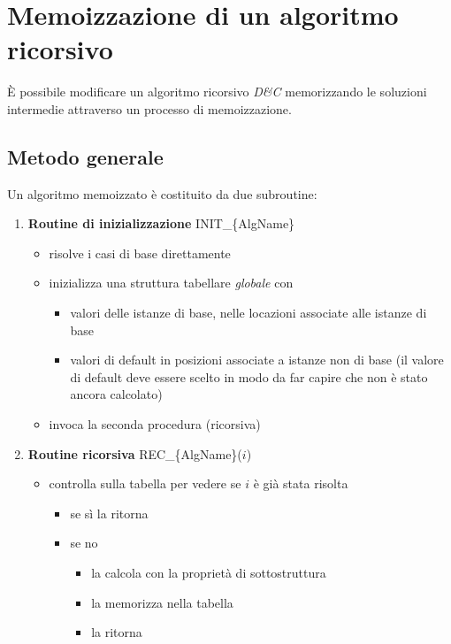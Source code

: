 \section{Memoizzazione di un algoritmo ricorsivo}

È possibile modificare un algoritmo ricorsivo \emph{D\&C} memorizzando le soluzioni intermedie attraverso un processo di memoizzazione.

\subsection{Metodo generale}

Un algoritmo memoizzato è costituito da due subroutine:
\begin{enumerate}
    \item \textbf{Routine di inizializzazione} INIT\_\{AlgName\}
        \begin{itemize}
            \item risolve i casi di base direttamente
            \item inizializza una struttura tabellare \emph{globale} con
                \begin{itemize}
                    \item valori delle istanze di base, nelle locazioni associate alle istanze di base
                    \item valori di default in posizioni associate a istanze non di base (il valore di default deve essere scelto in modo da far capire che non è stato ancora calcolato)
                \end{itemize}
            \item invoca la seconda procedura (ricorsiva) \\ %
        \end{itemize}
    \item \textbf{Routine ricorsiva} REC\_\{AlgName\}($i$)
        \begin{itemize}
            \item controlla sulla tabella per vedere se $i$ è già stata risolta
                \begin{itemize}
                    \item se sì la ritorna
                    \item se no
                        \begin{itemize}
                            \item la calcola con la proprietà di sottostruttura
                            \item la memorizza nella tabella
                            \item la ritorna
                        \end{itemize}
                \end{itemize}
        \end{itemize}
\end{enumerate}

